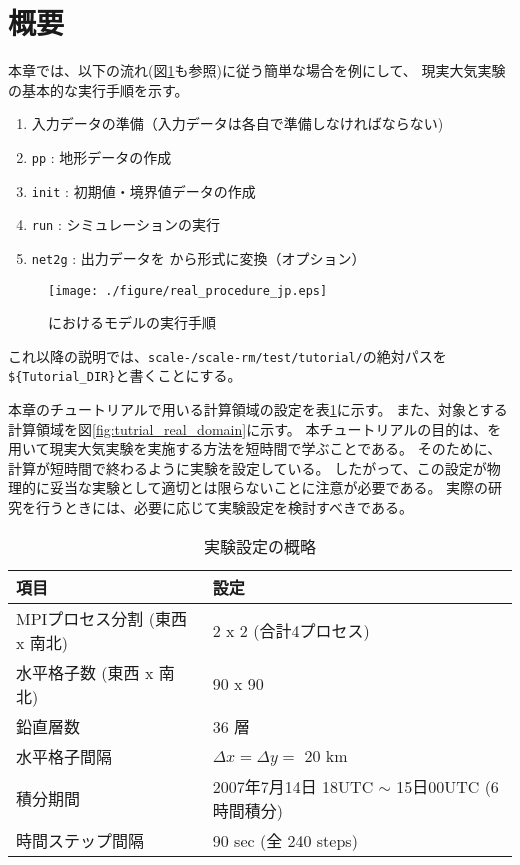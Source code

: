 \section{概要} \label{sec:tutrial_real_intro}
本章では、以下の流れ(図\ref{fig:howto}も参照)に従う簡単な場合を例にして、
現実大気実験の基本的な実行手順を示す。
\begin{enumerate}
\item  入力データの準備（入力データは各自で準備しなければならない)
\item  \texttt{pp}      : 地形データの作成
\item  \texttt{init}    : 初期値・境界値データの作成
\item  \texttt{run}     : シミュレーションの実行
\item  \texttt{net2g}   : 出力データを \netcdf から\grads 形式に変換（オプション）
\end{enumerate}

\begin{figure}[b]
\begin{center}
  \texttt{[image: ./figure/real\_procedure\_jp.eps]}\\
  \caption{\scalerm におけるモデルの実行手順}
  \label{fig:howto}
\end{center}
\end{figure}

これ以降の説明では、\texttt{scale-{\version}/scale-rm/test/tutorial/}の絶対パスを
\verb|${Tutorial_DIR}|と書くことにする。

本章のチュートリアルで用いる計算領域の設定を表\ref{tab:grids}に示す。
また、対象とする計算領域を図\ref{fig:tutrial_real_domain}に示す。
本チュートリアルの目的は、\scalerm を用いて現実大気実験を実施する方法を短時間で学ぶことである。
そのために、計算が短時間で終わるように実験を設定している。
したがって、この設定が物理的に妥当な実験として適切とは限らないことに注意が必要である。
実際の研究を行うときには、必要に応じて実験設定を検討すべきである。

\begin{table}[h]
\begin{center}
  \caption{実験設定の概略}
  \label{tab:grids}
  \begin{tabularx}{150mm}{|l|X|} \hline
    \rowcolor[gray]{0.9} 項目 & 設定 \\ \hline
    MPIプロセス分割 (東西 x 南北) & 2 x 2 (合計4プロセス) \\ \hline
    水平格子数 (東西 x 南北) & 90 x 90 \\ \hline
    鉛直層数                 & 36 層                  \\ \hline
    水平格子間隔             & $\Delta x = \Delta y =$ 20 km       \\ \hline
    積分期間 & 2007年7月14日 18UTC $\sim$ 15日00UTC (6時間積分) \\ \hline
    時間ステップ間隔 & 90 sec (全 240 steps) \\ \hline
  \end{tabularx}
\end{center}
\end{table}

